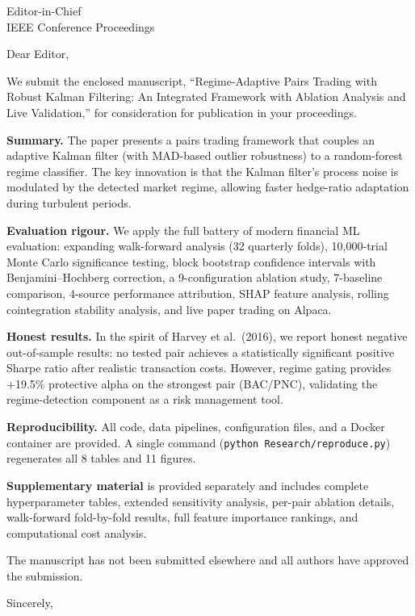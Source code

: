 \documentclass[11pt]{letter}
\begin{document}
\begin{letter}{Editor-in-Chief \\ IEEE Conference Proceedings}

\opening{Dear Editor,}

We submit the enclosed manuscript, ``Regime-Adaptive Pairs Trading with
Robust Kalman Filtering: An Integrated Framework with Ablation Analysis
and Live Validation,'' for consideration for publication in your
proceedings.

\textbf{Summary.}
The paper presents a pairs trading framework that couples an adaptive
Kalman filter (with MAD-based outlier robustness) to a random-forest
regime classifier.  The key innovation is that the Kalman filter's
process noise is modulated by the detected market regime, allowing
faster hedge-ratio adaptation during turbulent periods.

\textbf{Evaluation rigour.}
We apply the full battery of modern financial ML evaluation:
expanding walk-forward analysis (32 quarterly folds), 10{,}000-trial
Monte Carlo significance testing, block bootstrap confidence intervals
with Benjamini--Hochberg correction, a 9-configuration ablation study,
7-baseline comparison, 4-source performance attribution, SHAP feature
analysis, rolling cointegration stability analysis, and live paper
trading on Alpaca.

\textbf{Honest results.}
In the spirit of Harvey et al.\ (2016), we report honest negative
out-of-sample results: no tested pair achieves a statistically
significant positive Sharpe ratio after realistic transaction costs.
However, regime gating provides +19.5\% protective alpha on the
strongest pair (BAC/PNC), validating the regime-detection component as
a risk management tool.

\textbf{Reproducibility.}
All code, data pipelines, configuration files, and a Docker container
are provided.  A single command (\texttt{python Research/reproduce.py})
regenerates all 8 tables and 11 figures.

\textbf{Supplementary material} is provided separately and includes
complete hyperparameter tables, extended sensitivity analysis,
per-pair ablation details, walk-forward fold-by-fold results,
full feature importance rankings, and computational cost analysis.

The manuscript has not been submitted elsewhere and all authors have
approved the submission.

\closing{Sincerely,}

\end{letter}
\end{document}
